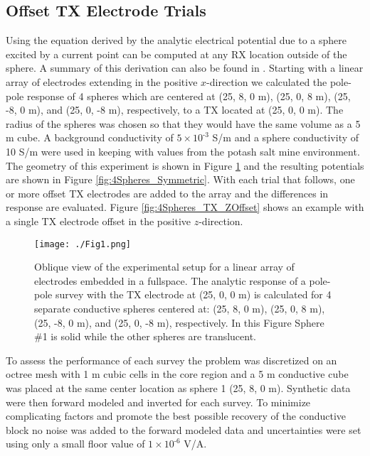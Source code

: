\documentclass[preprint,authoryear,12pt]{elsarticle}
\begin{document}
\subsection{Offset TX Electrode Trials}
\label{sec:TheoreticalAnalysis_OffsetTrials}

Using the equation derived by \citet{Wait1982m} the analytic electrical potential due to a sphere excited by a current point can be computed at any RX location outside of the sphere. A summary of this derivation can also be found in \citet{Mitchell2020}.  Starting with a linear array of electrodes extending in the positive $x$-direction we calculated the pole-pole response of 4 spheres which are centered at (25, 8, 0 m), (25, 0, 8 m), (25, -8, 0 m), and (25, 0, -8 m), respectively, to a TX located at (25, 0, 0 m). The radius of the spheres was chosen so that they would have the same volume as a 5 m cube. A background conductivity of $5 \times 10^{\text{-3}}$ S/m and a sphere conductivity of 10 S/m were used in keeping with values from the potash salt mine environment. The geometry of this experiment is shown in Figure \ref{fig:4Spheres_ObliqueView} and the resulting potentials are shown in Figure \ref{fig:4Spheres_Symmetric}. With each trial that follows, one or more offset TX electrodes are added to the array and the differences in response are evaluated. Figure \ref{fig:4Spheres_TX_ZOffset} shows an example with a single TX electrode offset in the positive $z$-direction.

\begin{figure}[htp]
   \begin{center}
      \texttt{[image: ./Fig1.png]}
   \end{center}
\caption{Oblique view of the experimental setup for a linear array of electrodes embedded in a fullspace. The analytic response of a pole-pole survey with the TX electrode at (25, 0, 0 m) is calculated for 4 separate conductive spheres centered at: (25, 8, 0 m), (25, 0, 8 m), (25, -8, 0 m), and (25, 0, -8 m), respectively. In this Figure Sphere \#1 is solid while the other spheres are translucent.}
\label{fig:4Spheres_ObliqueView}
\end{figure}

To assess the performance of each survey the problem was discretized on an octree mesh with 1 m cubic cells in the core region and a 5 m conductive cube was placed at the same center location as sphere 1 (25, 8, 0 m). Synthetic data were then forward modeled and inverted for each survey. To minimize complicating factors and promote the best possible recovery of the conductive block no noise was added to the forward modeled data and uncertainties were set using only a small floor value of $1 \times 10^{\text{-6}}$ V/A.
\end{document}
